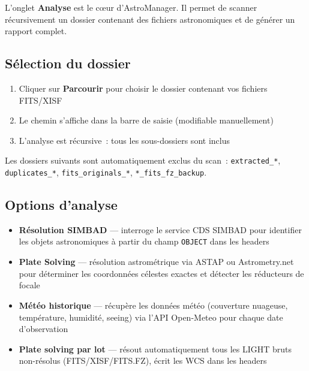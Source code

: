 \documentclass[a4paper,11pt]{article}
\begin{document}
L'onglet \textbf{Analyse} est le c\oe{}ur d'AstroManager. Il permet de scanner r\'{e}cursivement un dossier contenant des fichiers astronomiques et de g\'{e}n\'{e}rer un rapport complet.

\subsection{S\'{e}lection du dossier}

\begin{enumerate}
    \item Cliquer sur \textbf{Parcourir} pour choisir le dossier contenant vos fichiers FITS/XISF
    \item Le chemin s'affiche dans la barre de saisie (modifiable manuellement)
    \item L'analyse est r\'{e}cursive~: tous les sous-dossiers sont inclus
\end{enumerate}

\begin{notebox}
Les dossiers suivants sont automatiquement exclus du scan~: \texttt{extracted\_*}, \texttt{duplicates\_*}, \texttt{fits\_originals\_*}, \texttt{*\_fits\_fz\_backup}.
\end{notebox}

\subsection{Options d'analyse}

\begin{itemize}
    \item \textbf{R\'{e}solution SIMBAD} --- interroge le service CDS SIMBAD pour identifier les objets astronomiques \`{a} partir du champ \texttt{OBJECT} dans les headers
    \item \textbf{Plate Solving} --- r\'{e}solution astrom\'{e}trique via ASTAP ou Astrometry.net pour d\'{e}terminer les coordonn\'{e}es c\'{e}lestes exactes et d\'{e}tecter les r\'{e}ducteurs de focale
    \item \textbf{M\'{e}t\'{e}o historique} --- r\'{e}cup\`{e}re les donn\'{e}es m\'{e}t\'{e}o (couverture nuageuse, temp\'{e}rature, humidit\'{e}, seeing) via l'API Open-Meteo pour chaque date d'observation
    \item \textbf{Plate solving par lot} --- r\'{e}sout automatiquement tous les LIGHT bruts non-r\'{e}solus (FITS/XISF/FITS.FZ), \'{e}crit les WCS dans les headers
\end{itemize}
\end{document}
